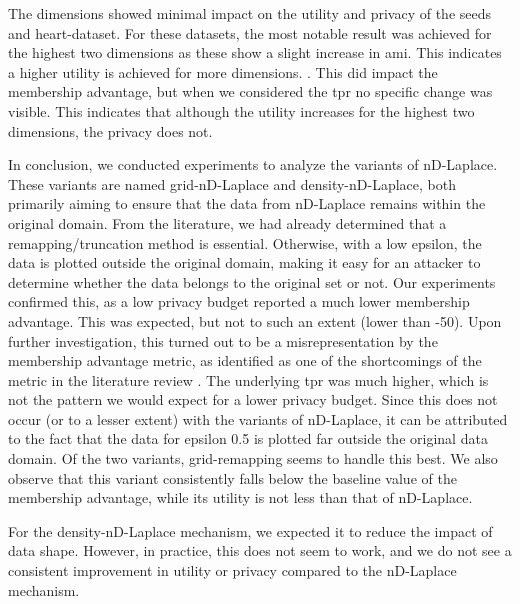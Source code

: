 The dimensions showed minimal impact on the utility and privacy of the seeds and heart-dataset.
For these datasets, the most notable result was achieved for the highest two dimensions as these show a slight increase in \gls{ami}. This indicates a higher utility is achieved for more dimensions. . This did impact the membership advantage, but when we considered the \gls{tpr} no specific change was visible. This indicates that although the utility increases for the highest two dimensions, the privacy does not. 

In conclusion, we conducted experiments to analyze the variants of nD-Laplace. These variants are named grid-nD-Laplace and density-nD-Laplace, both primarily aiming to ensure that the data from nD-Laplace remains within the original domain. 
From the literature, we had already determined that a remapping/truncation method is essential. Otherwise, with a low epsilon, the data is plotted outside the original domain, making it easy for an attacker to determine whether the data belongs to the original set or not.
Our experiments confirmed this, as a low privacy budget reported a much lower membership advantage. This was expected, but not to such an extent (lower than -50). 
Upon further investigation, this turned out to be a misrepresentation by the membership advantage metric, as identified as one of the shortcomings of the metric in the literature review . The underlying \gls{tpr} was much higher, which is not the pattern we would expect for a lower privacy budget.
Since this does not occur (or to a lesser extent) with the variants of nD-Laplace, it can be attributed to the fact that the data for epsilon 0.5 is plotted far outside the original data domain. 
Of the two variants, grid-remapping seems to handle this best. We also observe that this variant consistently falls below the baseline value of the membership advantage, while its utility is not less than that of nD-Laplace.

For the density-nD-Laplace mechanism, we expected it to reduce the impact of data shape. However, in practice, this does not seem to work, and we do not see a consistent improvement in utility or privacy compared to the nD-Laplace mechanism. \newline


